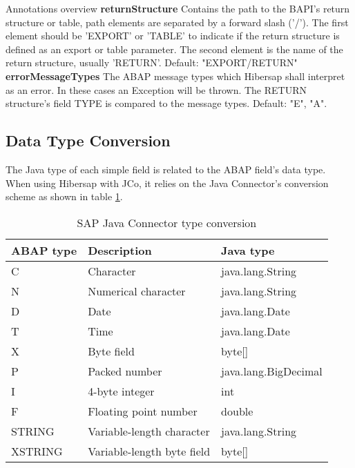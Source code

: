 \begin{descriptionBlock}{Annotations overview}
    \textbf{returnStructure} Contains the path to the BAPI's return
    structure or table, path elements are separated by a forward slash ('/'). The first element should be 'EXPORT' or 
    'TABLE' to indicate if the return structure is defined as an
    export or table parameter. The second element is the name of the 
    return structure, usually 'RETURN'. Default: "EXPORT/RETURN"\\
    \textbf{errorMessageTypes} The ABAP message types which Hibersap shall interpret as an error. In these cases an Exception
    will be thrown. The RETURN structure's field TYPE is compared to the message types. Default: "E", "A".\\
\end{descriptionBlock}

\subsection{Data Type Conversion}

The Java type of each simple field is related to the ABAP field's data type.
When using Hibersap with JCo, it relies on the Java Connector's conversion scheme as shown in table \ref{tab:JCoConversion}.

\begin{table}[H]
  \centering
  \begin{tabular}{lll} \toprule
    \textbf{ABAP type} & \textbf{Description}       & \textbf{Java type} \\ \midrule
    C                  & Character                  & java.lang.String \\
    N                  & Numerical character        & java.lang.String \\
    D                  & Date                       & java.lang.Date \\
    T                  & Time                       & java.lang.Date \\
    X                  & Byte field                 & byte[] \\
    P                  & Packed number              & java.lang.BigDecimal \\
    I                  & 4-byte integer             & int \\
    F                  & Floating point number      & double \\
    STRING             & Variable-length character  & java.lang.String \\
    XSTRING            & Variable-length byte field & byte[] \\ \bottomrule
  \end{tabular}
  \caption{SAP Java Connector type conversion}
  \label{tab:JCoConversion}
\end{table}

